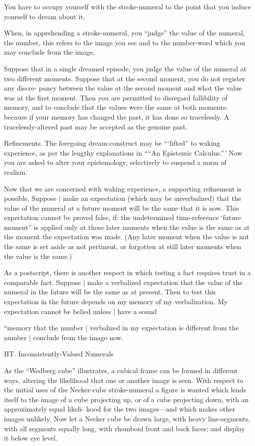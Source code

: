 You have to occupy yourself with the stroke-numeral to the point that you induce 
yourself to dream about it. 

When, in apprehending a stroke-numeral, you “judge” the value of the numeral, the 
number, this refers to the image you see and to the number-word which you may conclude 
from the image. 

Suppose that in a single dreamed episode, you judge the value of the numeral at two 
different moments. Suppose that at the second moment, you do not register any discre- 
pancy between the value at the second moment and what the value was at the first 
moment. Then you are permitted to disregard fallibility of memory, and to conclude that the 
values were the same at both moments: because if your memory has changed the past, it 
has done so tracelessly. A tracelessly-altered past may be accepted as the genuine past. 


Refinements. The foregoing dream-construct may be “‘lifted” to waking experience, as 
per the lengthy explanations in ““An Epistemic Calculus.”’ Now you are asked to alter your 
epistemology, selectively to suspend a norm of realism. 

Now that we are concerned with waking experience, a supporting refinement is 
possible. Suppose | make an expectation (which may be unverbalized) that the value of the 
numeral at a future moment will be the same that it is now. This expectation cannot be 
proved false, if: the undetermined time-reference ‘future moment” is applied only at those 
later moments when the value is the same as at the moment the expectation was made. 
(Any later moment when the value is not the same is set aside as not pertinent, or forgotten 
at still later moments when the value is the same.) 


As a postscript, there is another respect in which testing a fact requires trust in a 
comparable fact. Suppose | make a verbalized expectation that the value of the numeral in 
the future will be the same as at present. Then to test this expectation in the future depends 
on my memory of my verbalization. My expectation cannot be belied unless | have a sound 

“memory that the number | verbalized in my expectation is different from the number | 
conclude from the image now. 


HT. Inconsistently-Valued Numerals 


As the “Wedberg cube” illustrates, a cubical frame can be formed 
in different ways, altering the likelihood that one or another image is 
seen. With respect to the initial uses of the Necker-cube stroke-numeral 
a figure is wanted which lends itself to the image of a cube projecting 
up, or of a cube projecting down, with an approximately equal likeli- 
hood for the two images—and which makes other images unlikely. 
Now let a Necker cube be drawn large, with heavy line-segments, with 
all segments equally long, with rhomboid front and back faces; and 
display it below eye level. 


